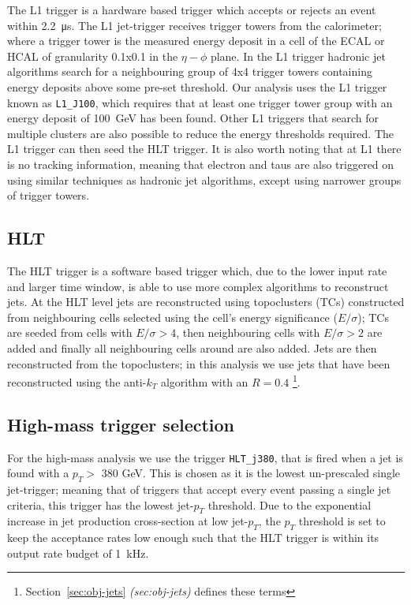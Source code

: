 The L1 trigger is a hardware based trigger which accepts or rejects an event within \SI{2.2}{\micro\second}.
The L1 jet-trigger receives trigger towers from the calorimeter;
where a trigger tower is the measured energy deposit in a cell of the ECAL or HCAL of granularity 0.1x0.1 in the $\eta-\phi$ plane.
In the L1 trigger hadronic jet algorithms search for a neighbouring group of 4x4 trigger towers containing energy deposits above some pre-set threshold.
Our analysis uses the L1 trigger known as \verb|L1_J100|, which requires that at least one trigger tower group with an energy deposit of \SI{100}{\GeV} has been found.
Other L1 triggers that search for multiple clusters are also possible to reduce the energy thresholds required.
The L1 trigger can then seed the HLT trigger.
It is also worth noting that at L1 there is no tracking information, meaning that electron and taus
are also triggered on using similar techniques as hadronic jet algorithms, except using narrower groups of trigger towers.
\\

\subsection{HLT}

The HLT trigger is a software based trigger which, due to the lower input rate and larger time window,
is able to use more complex algorithms to reconstruct jets.
At the HLT level jets are reconstructed using topoclusters (TCs) constructed from neighbouring cells selected using the cell's energy significance ($E/\sigma$);
TCs are seeded from cells with $E/\sigma > 4$, then neighbouring cells with $E/\sigma > 2$ are added
and finally all neighbouring cells around are also added.
Jets are then reconstructed from the topoclusters;
in this analysis we use jets that have been reconstructed using
the anti-$k_T$ algorithm with an $R = 0.4$ \footnote{Section~\ref{sec:obj-jets} \textit{(sec:obj-jets)} defines these terms}.

\subsection{High-mass trigger selection}

For the high-mass analysis we use the trigger \verb|HLT_j380|, that is fired when a jet is found with a $p_T >$ 380 GeV.
This is chosen as it is the lowest un-prescaled single jet-trigger;
meaning that of triggers that accept every event passing a single jet criteria,
this trigger has the lowest jet-$p_T$ threshold.
Due to the exponential increase in jet production cross-section at low jet-$p_T$,
the $p_T$ threshold is set to keep the acceptance rates low enough such that the HLT trigger is within its output rate budget of 1~kHz.\\

